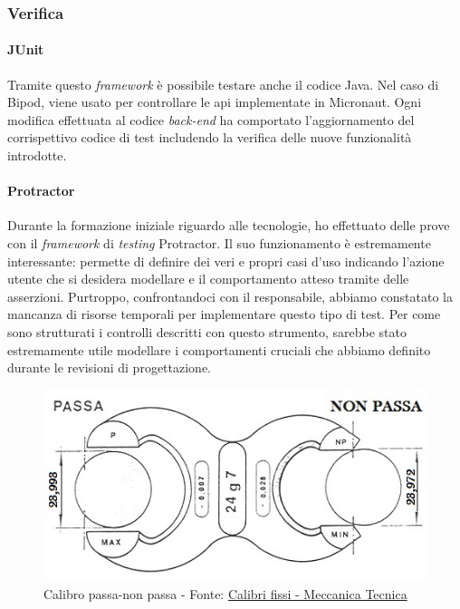 \subsubsection{Verifica}
\paragraph{JUnit}
Tramite questo \textit{framework} è possibile testare anche il codice Java. Nel caso di Bipod, viene usato per controllare le \acrshort{api} implementate in Micronaut. Ogni modifica effettuata al codice \textit{back-end} ha comportato l'aggiornamento del corrispettivo codice di test includendo la verifica delle nuove funzionalità introdotte.
\newpage
\paragraph{Protractor}
Durante la formazione iniziale riguardo alle tecnologie, ho effettuato delle prove con il \textit{framework} di \textit{testing} Protractor. Il suo funzionamento è estremamente interessante: permette di definire dei veri e propri casi d'uso indicando l'azione utente che si desidera modellare e il comportamento atteso tramite delle asserzioni.
Purtroppo, confrontandoci con il responsabile, abbiamo constatato la mancanza di risorse temporali per implementare questo tipo di test. Per come sono strutturati i controlli descritti con questo strumento, sarebbe stato estremamente utile modellare i comportamenti cruciali che abbiamo definito durante le revisioni di progettazione.
\begin{figure}[H]
    \centering
    \includegraphics[width=0.65\columnwidth]{immagini/passa-non-passa.jpg}
    \caption{Calibro passa-non passa - Fonte: \href{https://meccanicatecnica.altervista.org/calibri-fissi/}{Calibri fissi - Meccanica Tecnica}}
    \label{fig:passaNonPassa}
\end{figure}
